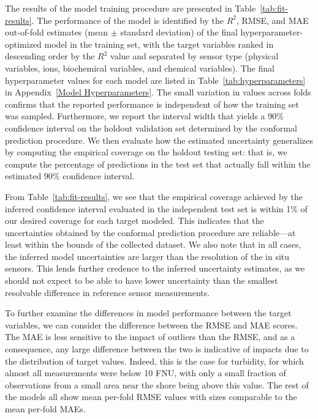 \documentclass[remotesensing,article,accept,pdftex,moreauthors]{Definitions/mdpi}
\begin{document}
The results of the model training procedure are presented in Table~\ref{tab:fit-results}. The performance of the model is identified by the $R^2$, RMSE, and MAE out-of-fold estimates (mean $\pm$ standard deviation) of the final hyperparameter-optimized model in the training set, with the target variables ranked in descending order by the $R^2$ value and separated by sensor type (physical variables, ions, biochemical variables, and chemical variables). The final hyperparameter values for each model are listed in Table~\ref{tab:hyperparameters} in Appendix~\ref{Model Hyperparameters}. The small variation in values across folds confirms that the reported performance is independent of how the training set was sampled. Furthermore, we report the interval width that yields a 90\% confidence interval on the holdout validation set determined by the conformal prediction procedure. We then evaluate how the estimated uncertainty generalizes by computing the empirical coverage on the holdout testing set: that is, we compute the percentage of predictions in the test set that actually fall within the estimated 90\% confidence interval. 

From Table~\ref{tab:fit-results},  we see that the empirical coverage achieved by the inferred confidence interval evaluated in the independent test set is within 1\% of our desired coverage for each target modeled. This indicates that the uncertainties obtained by the conformal prediction procedure are reliable---at least within the bounds of the collected dataset. We also note that in all cases, the inferred model uncertainties are larger than the resolution of the in situ sensors. This lends further credence to the inferred uncertainty estimates, as we should not expect to be able to have lower uncertainty than the smallest resolvable difference in reference sensor measurements.

To further examine the differences in model performance between the target variables, we can consider the difference between the RMSE and MAE scores. The MAE is less sensitive to the impact of outliers than the RMSE, and as a consequence, any large difference between the two is indicative of impacts due to the distribution of target values. Indeed, this is the case for turbidity, for which almost all measurements were below 10 FNU, with only a small fraction of observations from a small area near the shore being above this value. %
The rest of the models all show mean per-fold RMSE values with sizes comparable to the mean per-fold MAEs. 
\end{document}

